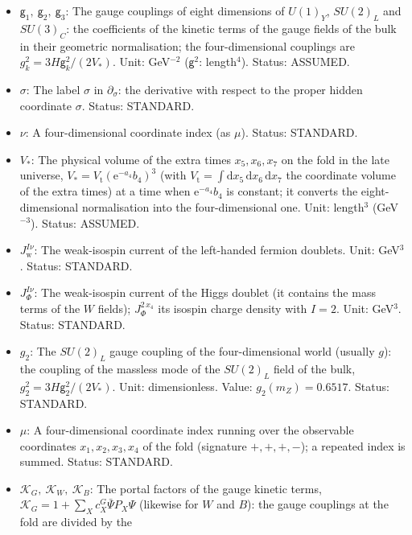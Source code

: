 \documentclass[
  10pt,
]{article}
\begin{document}
\begin{itemize}
  \(x_0\) is the whole line \(-\infty < \sigma < \infty\). Unit: length.
  Status: DERIVED.
\item
  \(\mathsf{g}_1,\ \mathsf{g}_2,\ \mathsf{g}_3\): The gauge couplings of
  eight dimensions of \(U(1)_Y\), \(SU(2)_L\) and \(SU(3)_C\): the
  coefficients of the kinetic terms of the gauge fields of the bulk in
  their geometric normalisation; the four-dimensional couplings are
  \(g_k^2 = 3H\mathsf{g}_k^2/(2V_*)\). Unit: GeV\(^{-2}\)
  (\(\mathsf{g}^2\): length\(^4\)). Status: ASSUMED.
\item
  \(\sigma\): The label \(\sigma\) in \(\partial_\sigma\): the
  derivative with respect to the proper hidden coordinate \(\sigma\).
  Status: STANDARD.
\item
  \(\nu\): A four-dimensional coordinate index (as \(\mu\)). Status:
  STANDARD.
\item
  \(V_*\): The physical volume of the extra times \(x_5, x_6, x_7\) on
  the fold in the late universe,
  \(V_* = V_{\mathrm{t}}(\mathrm{e}^{-a_4}b_4)^3\) (with
  \(V_{\mathrm{t}} = \int\mathrm{d}x_5\,\mathrm{d}x_6\,\mathrm{d}x_7\)
  the coordinate volume of the extra times) at a time when
  \(\mathrm{e}^{-a_4}b_4\) is constant; it converts the
  eight-dimensional normalisation into the four-dimensional one. Unit:
  length\(^3\) (GeV\(^{-3}\)). Status: ASSUMED.
\item
  \(J_{\mathrm{w}}^{I\nu}\): The weak-isospin current of the left-handed
  fermion doublets. Unit: GeV\(^3\). Status: STANDARD.
\item
  \(J_\Phi^{I\nu}\): The weak-isospin current of the Higgs doublet (it
  contains the mass terms of the \(W\) fields); \(J_\Phi^{2\,x_4}\) its
  isospin charge density with \(I = 2\). Unit: GeV\(^3\). Status:
  STANDARD.
\item
  \(g_2\): The \(SU(2)_L\) gauge coupling of the four-dimensional world
  (usually \(g\)): the coupling of the massless mode of the \(SU(2)_L\)
  field of the bulk, \(g_2^2 = 3H\mathsf{g}_2^2/(2V_*)\). Unit:
  dimensionless. Value: \(g_2(m_Z) = 0.6517\). Status: STANDARD.
\item
  \(\mu\): A four-dimensional coordinate index running over the
  observable coordinates \(x_1, x_2, x_3, x_4\) of the fold (signature
  \(+,+,+,-\)); a repeated index is summed. Status: STANDARD.
\item
  \(\mathcal{K}_{G},\ \mathcal{K}_{W},\ \mathcal{K}_{B}\): The portal
  factors of the gauge kinetic terms,
  \(\mathcal{K}_{G} = 1 + \sum_Xc^{G}_X\bar\Psi P_X\Psi\) (likewise for
  \(W\) and \(B\)): the gauge couplings at the fold are divided by the

\end{itemize}
\end{document}
